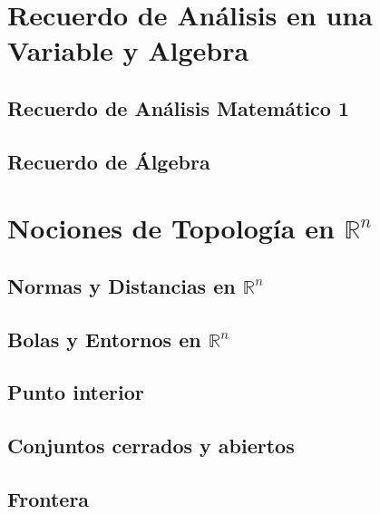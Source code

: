 \documentclass{report}
\begin{document}
 \chapter{Recuerdo de An\'alisis en una Variable y Algebra}


\section{Recuerdo de Análisis Matemático 1}

          
      
        
\section{Recuerdo de Álgebra}

           
     


\chapter{Nociones de Topolog\'ia en $\mathbb{R}^{n}$}
\section{Normas y Distancias en $\mathbb{R}^{n}$}


\section{Bolas y Entornos en  $\mathbb{R}^{n}$}



\section{Punto interior}



\section{Conjuntos cerrados y abiertos}



\section{Frontera}

\end{document}
